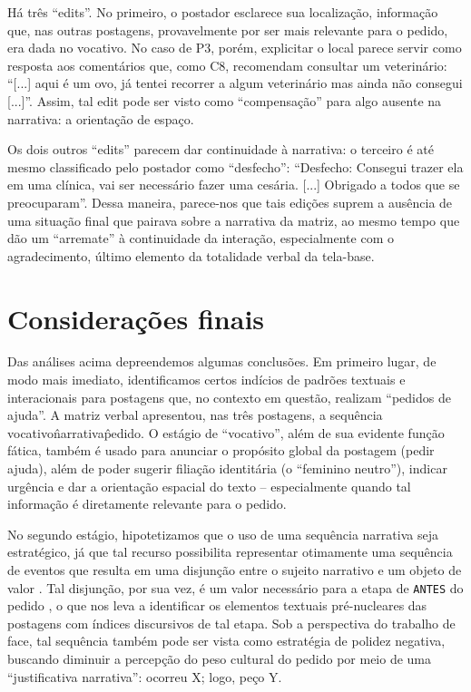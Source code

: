 \documentclass{textolivre-html}
\begin{document}
Há três “edits”. No primeiro, o postador esclarece sua localização, informação que, nas outras postagens, provavelmente por ser mais relevante para o pedido, era dada no vocativo. No caso de P3, porém, explicitar o local parece servir como resposta aos comentários que, como C8, recomendam consultar um veterinário: “[...] aqui é um ovo, já tentei recorrer a algum veterinário mas ainda não consegui [...]”. Assim, tal edit pode ser visto como “compensação” para algo ausente na narrativa: a orientação de espaço.

Os dois outros “edits” parecem dar continuidade à narrativa: o terceiro é até mesmo classificado pelo postador como “desfecho”: “Desfecho: Consegui trazer ela em uma clínica, vai ser necessário fazer uma cesária. [...] Obrigado a todos que se preocuparam”. Dessa maneira, parece-nos que tais edições suprem a ausência de uma situação final que pairava sobre a narrativa da matriz, ao mesmo tempo que dão um “arremate” à continuidade da interação, especialmente com o agradecimento, último elemento da totalidade verbal da tela-base.

\section{Considerações finais}\label{sec-consideracoes}

Das análises acima depreendemos algumas conclusões. Em primeiro lugar, de modo mais imediato, identificamos certos indícios de padrões textuais e interacionais para postagens que, no contexto em questão, realizam “pedidos de ajuda”. A matriz verbal apresentou, nas três postagens, a sequência vocativo\^narrativa\^pedido. O estágio de “vocativo”, além de sua evidente função fática, também é usado para anunciar o propósito global da postagem (pedir ajuda), além de poder sugerir filiação identitária (o “feminino neutro”), indicar urgência e dar a orientação espacial do texto – especialmente quando tal informação é diretamente relevante para o pedido.

No segundo estágio, hipotetizamos que o uso de uma sequência narrativa seja estratégico, já que tal recurso possibilita representar otimamente uma sequência de eventos que resulta em uma disjunção entre o sujeito narrativo e um objeto de valor \parencites{adam1992}[cf.][]{greimas1973}. Tal disjunção, por sua vez, é um valor necessário para a etapa de \texttt{ANTES} do pedido \cite{panther2017}, o que nos leva a identificar os elementos textuais pré-nucleares das postagens com índices discursivos de tal etapa. Sob a perspectiva do trabalho de face, tal sequência também pode ser vista como estratégia de polidez negativa, buscando diminuir a percepção do peso cultural do pedido por meio de uma “justificativa narrativa”: ocorreu X; logo, peço Y.
\end{document}

